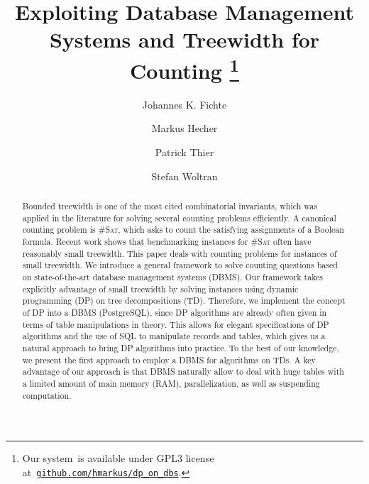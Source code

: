 \documentclass{llncs}
\title{Exploiting Database Management Systems and Treewidth for Counting%
  \thanks{%
    Our system~\dpdb is available under GPL3 license
    at~\href{https://github.com/hmarkus/dp_on_dbs/releases/tag/TODOv1.001-pre}{\nolinkurl{github.com/hmarkus/dp_on_dbs}}.
  }%
%
}
\author{Johannes K. Fichte\inst{1}\orcidID{0000-0002-8681-7470}%
  \and Markus Hecher\inst{2,3}\orcidID{0000-0003-0131-6771} 
  \and Patrick Thier\inst{2}\orcidID{TODO0000-0003-0131-6771}
  \and Stefan Woltran\inst{2}\orcidID{TODO0000-0003-0131-6771}
}%
\institute{TU Dresden, %
  Germany \email{johannes.fichte@tu-dresden.de} %
  \and TU Wien, %
  Austria \email{\{hecher,woltran,thier\}@dbai.tuwien.ac.at} \and %
  University of
  Potsdam, %
  Germany \email{hecher@uni-potsdam.de}
%
%
%
%
}
\newcommand{\cSAT}{\textsc{\#Sat}\xspace}%
\begin{document}
\maketitle

\begin{abstract}
Bounded treewidth is one of the most cited combinatorial invariants, which was applied in the literature for solving several counting problems efficiently. 
A canonical counting problem is \cSAT, which asks to count the satisfying assignments of a Boolean formula. Recent work shows that benchmarking instances for \cSAT often have reasonably small treewidth. %
This paper deals with counting problems for instances of small treewidth. We introduce a general framework to solve counting questions based on state-of-the-art database management systems (DBMS). Our framework takes explicitly advantage of small treewidth by solving instances using dynamic programming (DP) on tree decompositions (TD). Therefore, we implement the concept of DP into a DBMS (PostgreSQL), since DP algorithms are already often given in terms of table manipulations in theory. This allows for elegant specifications of DP algorithms and the use of SQL to manipulate records and tables, which gives us a natural approach to bring DP algorithms into practice. To the best of our knowledge, we present the first
approach to employ a DBMS for algorithms on TDs. A key advantage of our approach is that DBMS naturally allow to deal with huge tables with a limited amount of main memory (RAM), parallelization, as well as suspending %
computation.
\end{abstract}
\end{document}

